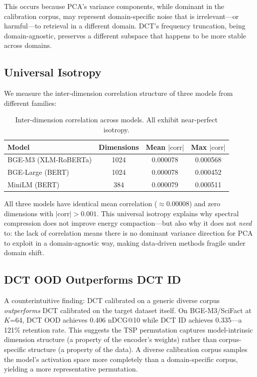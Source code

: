\documentclass[sigconf]{acmart}
\begin{document}
This occurs because PCA's variance components, while dominant in the calibration corpus, may represent domain-specific noise that is irrelevant---or harmful---to retrieval in a different domain. DCT's frequency truncation, being domain-agnostic, preserves a different subspace that happens to be more stable across domains.

\subsection{Universal Isotropy}\label{sec:isotropy}

We measure the inter-dimension correlation structure of three models from different families:

\begin{table}[h]
\centering
\caption{Inter-dimension correlation across models. All exhibit near-perfect isotropy.}
\label{tab:isotropy}
\begin{tabular}{lccc}
\toprule
Model & Dimensions & Mean $|\text{corr}|$ & Max $|\text{corr}|$ \\
\midrule
BGE-M3 (XLM-RoBERTa) & 1024 & 0.000078 & 0.000568 \\
BGE-Large (BERT) & 1024 & 0.000078 & 0.000452 \\
MiniLM (BERT) & 384 & 0.000079 & 0.000511 \\
\bottomrule
\end{tabular}
\end{table}

All three models have identical mean correlation ($\approx 0.00008$) and zero dimensions with $|\text{corr}| > 0.001$. This universal isotropy explains why spectral compression does not improve energy compaction---but also why it does not \emph{need} to: the lack of correlation means there is no dominant variance direction for PCA to exploit in a domain-agnostic way, making data-driven methods fragile under domain shift.

\subsection{DCT OOD Outperforms DCT ID}\label{sec:model_intrinsic}

A counterintuitive finding: DCT calibrated on a generic diverse corpus \emph{outperforms} DCT calibrated on the target dataset itself. On BGE-M3/SciFact at $K$=64, DCT OOD achieves 0.406 nDCG@10 while DCT ID achieves 0.335---a 121\% retention rate. This suggests the TSP permutation captures model-intrinsic dimension structure (a property of the encoder's weights) rather than corpus-specific structure (a property of the data). A diverse calibration corpus samples the model's activation space more completely than a domain-specific corpus, yielding a more representative permutation.
\end{document}
